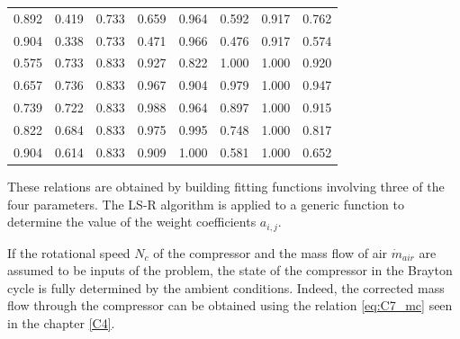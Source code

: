 \begin{longtable}[c]{@{}cccc|cccc@{}}
0.892                            & 0.419                      & 0.733                 & 0.659                       & 0.964                            & 0.592                      & 0.917                 & 0.762                       \\
0.904                            & 0.338                      & 0.733                 & 0.471                       & 0.966                            & 0.476                      & 0.917                 & 0.574                       \\
0.575                            & 0.733                      & 0.833                 & 0.927                       & 0.822                            & 1.000                      & 1.000                 & 0.920                       \\
0.657                            & 0.736                      & 0.833                 & 0.967                       & 0.904                            & 0.979                      & 1.000                 & 0.947                       \\
0.739                            & 0.722                      & 0.833                 & 0.988                       & 0.964                            & 0.897                      & 1.000                 & 0.915                       \\
0.822                            & 0.684                      & 0.833                 & 0.975                       & 0.995                            & 0.748                      & 1.000                 & 0.817                       \\
0.904                            & 0.614                      & 0.833                 & 0.909                       & 1.000                            & 0.581                      & 1.000                 & 0.652                       \\* \bottomrule
\end{longtable}
These relations are obtained by building fitting functions involving three of the four parameters. The LS-R algorithm is applied to a generic function to determine the value of the weight coefficients $a_{i,j}$. 

If the rotational speed $N_c$ of the compressor and the mass flow of air $\dot{m}_{air}$ are assumed to be inputs of the problem, the state of the compressor in the Brayton cycle is fully determined by the ambient conditions. Indeed, the corrected mass flow through the compressor can be obtained using the relation \ref{eq:C7_mc}
seen in the chapter \ref{C4}.


